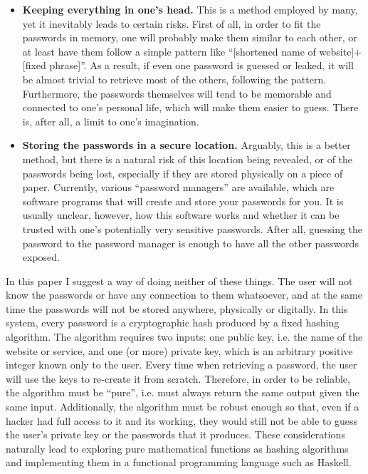 \documentclass[12pt, a4paper]{article}
\begin{document}
\begin{itemize}
    \item \textbf{Keeping everything in one's head.} This is a method employed by many, yet it inevitably leads to certain risks. First of all, in order to fit the passwords in memory, one will probably make them similar to each other, or at least have them follow a simple pattern like ``[shortened name of website]+[fixed phrase]''. As a result, if even one password is guessed or leaked, it will be almost trivial to retrieve most of the others, following the pattern. Furthermore, the passwords themselves will tend to be memorable and connected to one's personal life, which will make them easier to guess. There is, after all, a limit to one's imagination.
    \item \textbf{Storing the passwords in a secure location.} Arguably, this is a better method, but there is a natural risk of this location being revealed, or of the passwords being lost, especially if they are stored physically on a piece of paper. Currently, various ``password managers'' are available, which are software programs that will create and store your passwords for you. It is usually unclear, however, how this software works and whether it can be trusted with one's potentially very sensitive passwords. After all, guessing the password to the password manager is enough to have all the other passwords exposed.
\end{itemize}

In this paper I suggest a way of doing neither of these things. The user will not know the passwords or have any connection to them whatsoever, and at the same time the passwords will not be stored anywhere, physically or digitally. In this system, every password is a cryptographic hash produced by a fixed hashing algorithm. The algorithm requires two inputs: one public key, i.e. the name of the website or service, and one (or more) private key, which is an arbitrary positive integer known only to the user. Every time when retrieving a password, the user will use the keys to re-create it from scratch. Therefore, in order to be reliable, the algorithm must be ``pure'', i.e. must always return the same output given the same input. Additionally, the algorithm must be robust enough so that, even if a hacker had full access to it and its working, they would still not be able to guess the user's private key or the passwords that it produces. These considerations naturally lead to exploring pure mathematical functions as hashing algorithms and implementing them in a functional programming language such as Haskell.
\end{document}
